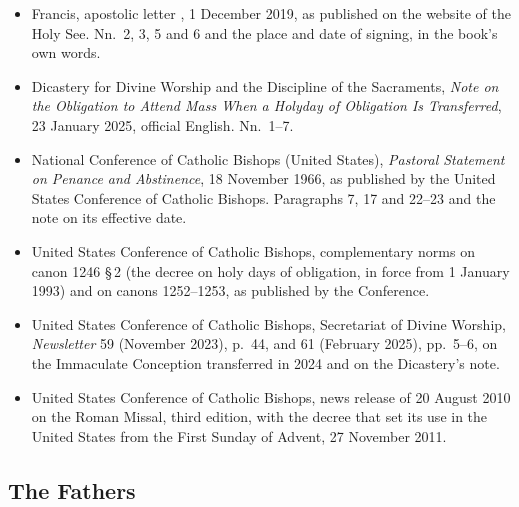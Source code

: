 \begin{itemize}[leftmargin=1.3em, itemsep=0.3em]
31 October 2019, in the book's own words.
\item Francis, apostolic letter , 1 December 2019, as published on the
website of the Holy See. Nn.~2, 3, 5 and 6 and the place and date of signing, in the book's own
words.
\item Dicastery for Divine Worship and the Discipline of the Sacraments, \textit{Note on the
Obligation to Attend Mass When a Holyday of Obligation Is Transferred}, 23 January 2025, official
English. Nn.~1--7.
\item National Conference of Catholic Bishops (United States), \textit{Pastoral Statement on
Penance and Abstinence}, 18 November 1966, as published by the United States Conference of
Catholic Bishops. Paragraphs 7, 17 and 22--23 and the note on its effective date.
\item United States Conference of Catholic Bishops, complementary norms on canon 1246 \S\,2 (the
decree on holy days of obligation, in force from 1 January 1993) and on canons 1252--1253, as
published by the Conference.
\item United States Conference of Catholic Bishops, Secretariat of Divine Worship,
\textit{Newsletter} 59 (November 2023), p.~44, and 61 (February 2025), pp.~5--6, on the
Immaculate Conception transferred in 2024 and on the Dicastery's note.
\item United States Conference of Catholic Bishops, news release of 20 August 2010 on the Roman
Missal, third edition, with the decree that set its use in the United States from the First
Sunday of Advent, 27 November 2011.
\end{itemize}

\subsection{The Fathers}

